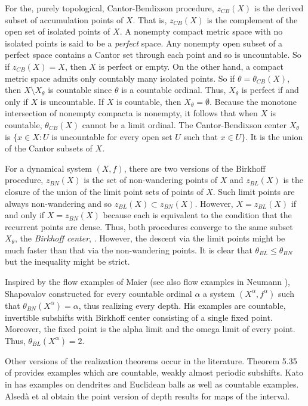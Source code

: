 \documentclass[12pt]{amsart}
\def \a {\alpha }
\def \th {\theta}
\numberwithin{equation}{section}
\begin{document}
For the, purely topological, Cantor-Bendixson procedure, $z_{CB}(X)$ is the derived subset of accumulation points of $X$. That is,
$z_{CB}(X)$ is the complement of the open set of isolated points of $X$. A nonempty compact metric space with no isolated points is
said to be a \emph{perfect} space.
Any nonempty open subset of a perfect space contains a Cantor set through each point and so is uncountable. So if $z_{CB}(X)= X$, then $X$ is perfect or
empty. On the other hand, a compact metric space admits
only countably many isolated points. So if $\th = \th_{CB}(X)$, then $X \setminus X_{\th}$ is countable since $\th$ is a countable ordinal. Thus,
$X_{\th}$ is perfect if and only if $X$ is uncountable.  If $X$ is countable, then $X_{\th} = \emptyset$. Because the monotone intersection of
nonempty compacta is nonempty, it follows that when $X$ is countable, $\th_{CB}(X)$ cannot be a limit ordinal. The Cantor-Bendixson
center  $X_{\th}$ is $\{ x \in X : U$ is uncountable for every open set $U$ such that $x \in U \}$. It is the union of the
Cantor subsets of $X$.


For a dynamical system $(X,f)$, there are two versions of
the Birkhoff procedure, $z_{BN}(X)$ is the set of non-wandering points of $X$ and
$z_{BL}(X)$ is the closure of the union of the limit point sets of points
of $X$. Such limit points are always non-wandering and so $z_{BL}(X) \subset z_{BN}(X)$. However, $X = z_{BL}(X)$ if and only if $X = z_{BN}(X)$ because
each is equivalent to the condition that the recurrent points are dense. Thus, both procedures converge to the same subset $X_{\th}$, the
\emph{Birkhoff center}, \cite{B}. However, the descent via the limit points might be much faster than that via the non-wandering points.  It is
clear that $\th_{BL} \le \th_{BN}$ but the inequality might be strict.

Inspired by the flow examples of Maier \cite{M}(see also flow examples in Neumann \cite{N}), Shapovalov \cite{S00} constructed for every countable ordinal $\a$ a system $(X^{\a},f^{\a})$ such that $\th_{BN}(X^{\a}) = \a$, thus realizing every depth. His examples are countable, invertible subshifts with Birkhoff center consisting of a single
fixed point. Moreover, the fixed point is the alpha limit and the omega limit of every point. Thus, $\th_{BL}(X^{\a}) = 2$.

Other versions of the realization theorems occur in the literature. Theorem 5.35 of \cite{AG19} provides examples which are countable, weakly almost periodic subshifts. Kato in \cite{K} has examples on dendrites and Euclidean balls as well as countable examples. Alsed\`{a} et al \cite{ACS}
obtain the point version of depth results for maps of the interval.
\end{document}
